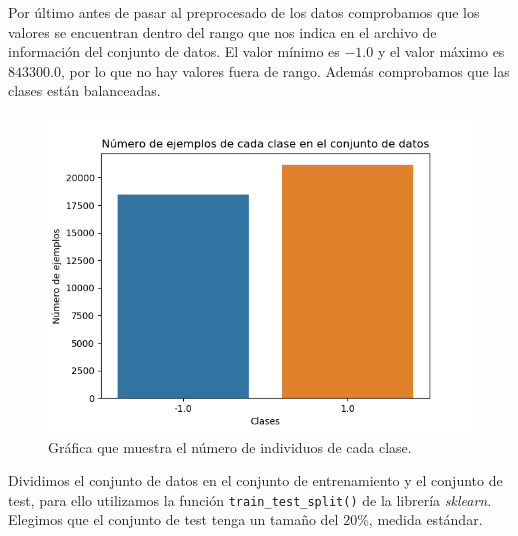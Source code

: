 \documentclass[size=a4, parskip=half, titlepage=false, toc=flat, toc=bib, 12pt]{scrartcl}
\begin{document}
Por último antes de pasar al preprocesado de los datos comprobamos que los valores se encuentran dentro del rango que nos indica en el archivo de información del conjunto de datos. El valor mínimo es $-1.0$ y el valor máximo es $843300.0$, por lo que no hay valores fuera de rango. Además comprobamos que las clases están balanceadas.
\begin{figure}[H]
\centering
\includegraphics[width=1\textwidth]{./img/balanceadas}
\caption{Gráfica que muestra el número de individuos de cada clase.}
\end{figure}

Dividimos el conjunto de datos en el conjunto de entrenamiento y el conjunto de test, para ello utilizamos la función \verb|train_test_split()| de la librería \textit{sklearn}. Elegimos que el conjunto de test tenga un tamaño del $20\%$, medida estándar.
\end{document}
